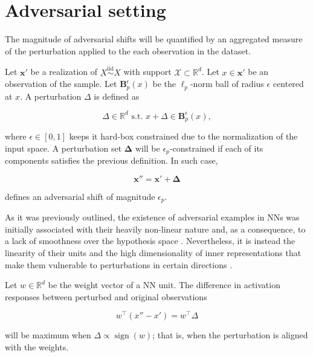 \section{Adversarial setting}\label{sec:adversarial_setting}

The magnitude of adversarial shifts will be quantified by an aggregated
measure of the perturbation applied to the each observation in the dataset.

\begin{definition}[Perturbation]\label{def:adversarial_perturbation}
    Let $\bm{x}'$ be a realization of $\underbar{X} \overset{\text{iid}}{\sim} X$ with support $\mathcal{X} \subset \mathbb{R}^d$.
    Let $x \in \bm{x}'$ be an observation of the sample.
    Let $\mathbf{B}_p^\epsilon(x)$ be the $\ell_p$-norm ball of radius 
    $\epsilon$ centered at $x$. A perturbation $\Delta$ is defined as

    $$
        \Delta \in \mathbb{R}^d \text{ s.t. } x + \Delta \in \mathbf{B}_p^\epsilon(x),
    $$

    where $\epsilon \in [0, 1]$ keeps it hard-box constrained due to the
    normalization of the input space. A perturbation set $\bm{\Delta}$
    will be $\epsilon_p$-constrained if each of its components
    satisfies the previous definition. In such case,

    $$
        \bm{x}'' = \bm{x}' + \bm{\Delta}
    $$

    defines an adversarial shift of magnitude $\epsilon_p$.
\end{definition}

As it was previously outlined, the existence of adversarial
examples in NNs was initially associated with their heavily non-linear nature 
and, as a consequence, to a lack of smoothness over the hypothesis space
\cite{szegedyIntriguingPropertiesNeural2014}.
Nevertheless, it is instead the linearity of their units and the high 
dimensionality of inner representations that make them vulnerable
to perturbations in certain directions
\cite{goodfellowExplainingHarnessingAdversarial2015}.\\

\begin{example}
Let $w \in \mathbb{R}^d$ be the weight vector of a NN unit.
The difference in activation responses between perturbed and original
observations

$$
w^\top (x'' - x') = w^\top \Delta
$$

will be maximum when $\Delta \propto \operatorname{sign}(w)$; that is,
when the perturbation is aligned with the weights. 
\end{example}

